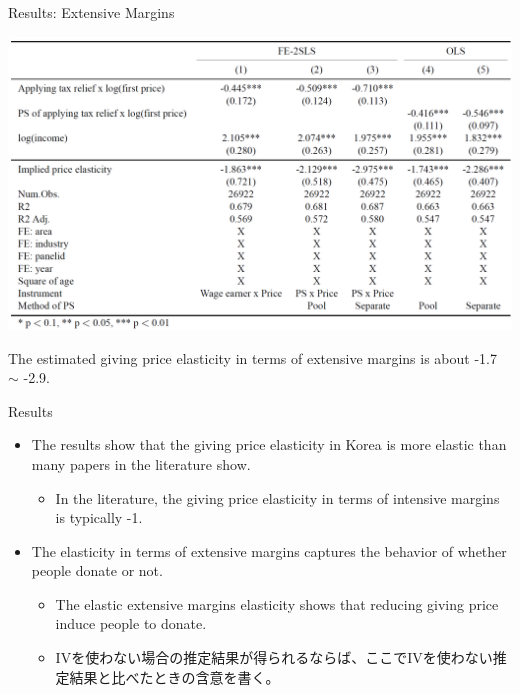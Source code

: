 \documentclass[dvipdfmx,10pt]{beamer}
\begin{document}
\begin{frame}{Results: Extensive Margins}
	\begin{table}
		\centering
		\includegraphics[width=0.9\linewidth]{Tab_res_2}
		\caption{First-Price Elasticities (Extensive Margins)}
		\label{tab:3}
	\end{table}
	The estimated giving price elasticity in terms of extensive margins is about -1.7 $\sim$ -2.9.
\end{frame}

\begin{frame}{Results}
	\begin{itemize}
		\item The results show that the giving price elasticity in Korea is more elastic than many papers in the literature show.
		\begin{itemize}
			\item In the literature, the giving price elasticity in terms of intensive margins is typically -1.
		\end{itemize}
		\item The elasticity in terms of extensive margins captures the behavior of whether people donate or not.
		  \begin{itemize}
		  	\item The elastic extensive margins elasticity shows that reducing giving price induce people to donate.
		  	\item IVを使わない場合の推定結果が得られるならば、ここでIVを使わない推定結果と比べたときの含意を書く。
		  \end{itemize}
	\end{itemize}
\end{frame}
\end{document}
